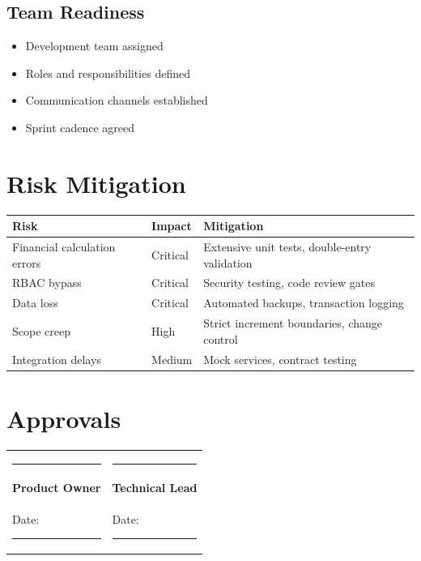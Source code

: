 \documentclass[11pt,a4paper]{article}
\begin{document}
\subsection{Team Readiness}
\begin{itemize}
    \item[$\square$] Development team assigned
    \item[$\square$] Roles and responsibilities defined
    \item[$\square$] Communication channels established
    \item[$\square$] Sprint cadence agreed
\end{itemize}

\section{Risk Mitigation}

\begin{tabular}{@{}p{4cm}p{4cm}p{5cm}@{}}
\toprule
\textbf{Risk} & \textbf{Impact} & \textbf{Mitigation} \\
\midrule
Financial calculation errors & Critical & Extensive unit tests, double-entry validation \\
\addlinespace
RBAC bypass & Critical & Security testing, code review gates \\
\addlinespace
Data loss & Critical & Automated backups, transaction logging \\
\addlinespace
Scope creep & High & Strict increment boundaries, change control \\
\addlinespace
Integration delays & Medium & Mock services, contract testing \\
\bottomrule
\end{tabular}

\section{Approvals}

\vspace{1cm}

\begin{tabular}{@{}p{6cm}p{6cm}@{}}
\rule{5cm}{0.4pt} & \rule{5cm}{0.4pt} \\
\textbf{Product Owner} & \textbf{Technical Lead} \\
Date: \rule{3cm}{0.4pt} & Date: \rule{3cm}{0.4pt} \\
\end{tabular}
\end{document}
